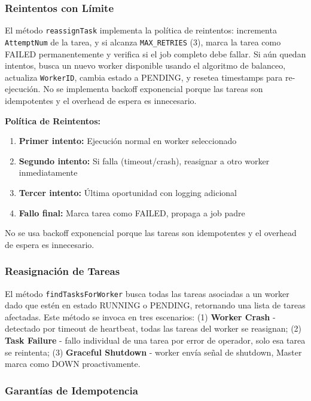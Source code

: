 \documentclass[conference]{IEEEtran}
\begin{document}
\subsubsection{Reintentos con Límite}

El método \texttt{reassignTask} implementa la política de reintentos: incrementa \texttt{AttemptNum} de la tarea, y si alcanza \texttt{MAX\_RETRIES} (3), marca la tarea como FAILED permanentemente y verifica si el job completo debe fallar. Si aún quedan intentos, busca un nuevo worker disponible usando el algoritmo de balanceo, actualiza \texttt{WorkerID}, cambia estado a PENDING, y resetea timestamps para re-ejecución. No se implementa backoff exponencial porque las tareas son idempotentes y el overhead de espera es innecesario.

\textbf{Política de Reintentos:}
\begin{enumerate}
\item \textbf{Primer intento:} Ejecución normal en worker seleccionado
\item \textbf{Segundo intento:} Si falla (timeout/crash), reasignar a otro worker inmediatamente
\item \textbf{Tercer intento:} Última oportunidad con logging adicional
\item \textbf{Fallo final:} Marca tarea como FAILED, propaga a job padre
\end{enumerate}

No se usa backoff exponencial porque las tareas son idempotentes y el overhead de espera es innecesario.

\subsubsection{Reasignación de Tareas}

El método \texttt{findTasksForWorker} busca todas las tareas asociadas a un worker dado que estén en estado RUNNING o PENDING, retornando una lista de tareas afectadas. Este método se invoca en tres escenarios: (1) \textbf{Worker Crash} - detectado por timeout de heartbeat, todas las tareas del worker se reasignan; (2) \textbf{Task Failure} - fallo individual de una tarea por error de operador, solo esa tarea se reintenta; (3) \textbf{Graceful Shutdown} - worker envía señal de shutdown, Master marca como DOWN proactivamente.

\subsubsection{Garantías de Idempotencia}
\end{document}
